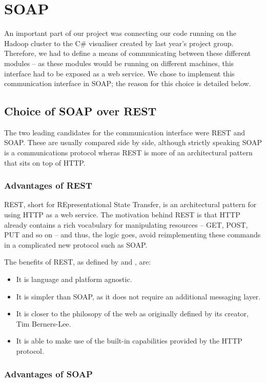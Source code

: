 \section{SOAP}

An important part of our project was connecting our code running on the Hadoop cluster to the C\# visualiser created by last year's project group. Therefore, we had to define a means of communicating between these different modules -- as these modules would be running on different machines, this interface had to be exposed as a web service. We chose to implement this communication interface in SOAP; the reason for this choice is detailed below.

\subsection{Choice of SOAP over REST}

The two leading candidates for the communication interface were REST and SOAP. These are usually compared side by side, although strictly speaking SOAP is a communications protocol wheras REST is more of an architectural pattern that sits on top of HTTP. \cite{infoq}

\subsubsection{Advantages of REST}

REST, short for REpresentational State Transfer, is an architectural pattern for using HTTP as a web service. The motivation behind REST is that HTTP already contains a rich vocabulary for manipulating resources -- GET, POST, PUT and so on -- and thus, the logic goes, avoid reimplementing these commands in a complicated new protocol such as SOAP.

The benefits of REST, as defined by \cite{ajoxonomy} and \cite{infoq}, are:
\begin{itemize}
\item It is language and platform agnostic.
\item It is simpler than SOAP, as it does not require an additional messaging
layer.
\item It is closer to the philosopy of the web as originally defined by its
creator, Tim Berners-Lee.
\item It is able to make use of the built-in capabilities provided by the HTTP
protocol.
\end{itemize}

\subsubsection{Advantages of SOAP}

